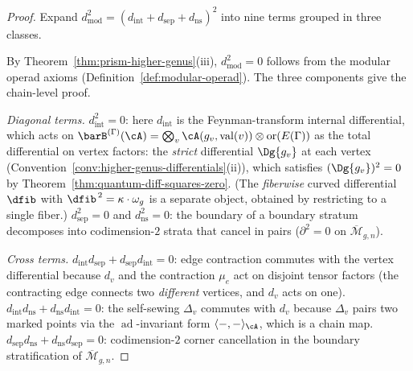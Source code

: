 \begin{proof}
Expand $d_{\mathrm{mod}}^2 = (d_{\mathrm{int}} + d_{\mathrm{sep}}
+ d_{\mathrm{ns}})^2$ into nine terms grouped in three classes.

By Theorem~\ref{thm:prism-higher-genus}(iii),
$d_{\mathrm{mod}}^2 = 0$ follows from the modular operad axioms
(Definition~\ref{def:modular-operad}). The three components give the
chain-level proof.

\emph{Diagonal terms.}
$d_{\mathrm{int}}^2 = 0$: here $d_{\mathrm{int}}$ is the
Feynman-transform internal differential, which acts on
$\barB^{(\Gamma)}(\cA) = \bigotimes_v \cA(g_v,
\operatorname{val}(v)) \otimes \operatorname{or}(E(\Gamma))$
as the total differential on vertex factors: the
\emph{strict} differential $\Dg{g_v}$ at each vertex
(Convention~\ref{conv:higher-genus-differentials}(ii)), which
satisfies $(\Dg{g_v})^2 = 0$ by
Theorem~\ref{thm:quantum-diff-squares-zero}. (The
\emph{fiberwise} curved differential $\dfib$ with
$\dfib^{\,2} = \kappa \cdot \omega_g$ is a separate object,
obtained by restricting to a single fiber.)
$d_{\mathrm{sep}}^2 = 0$ and $d_{\mathrm{ns}}^2 = 0$:
the boundary of a boundary stratum decomposes into
codimension-$2$ strata that cancel in pairs
($\partial^2 = 0$ on $\overline{\mathcal{M}}_{g,n}$).

\emph{Cross terms.}
$d_{\mathrm{int}} d_{\mathrm{sep}} + d_{\mathrm{sep}}
d_{\mathrm{int}} = 0$: edge contraction commutes with the vertex
differential because $d_v$ and the contraction $\mu_e$ act on
disjoint tensor factors (the contracting edge connects two
\emph{different} vertices, and $d_v$ acts on one).
$d_{\mathrm{int}} d_{\mathrm{ns}} + d_{\mathrm{ns}}
d_{\mathrm{int}} = 0$: the self-sewing $\Delta_v$ commutes with
$d_v$ because $\Delta_v$ pairs two marked points via the
$\operatorname{ad}$-invariant form $\langle -,- \rangle_\cA$,
which is a chain map.
$d_{\mathrm{sep}} d_{\mathrm{ns}} + d_{\mathrm{ns}}
d_{\mathrm{sep}} = 0$: codimension-$2$ corner cancellation
in the boundary stratification of $\overline{\mathcal{M}}_{g,n}$.
\end{proof}

